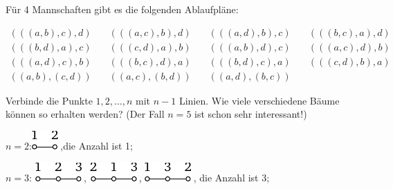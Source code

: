 \documentclass[12pt]{article} %
\begin{document}
Für 4 Mannschaften gibt es die folgenden Ablaufpläne:

$$\begin{array}{cccc}
(((a,b),c),d) & \quad (((a,c),b),d) & \quad (((a,d),b),c) & \quad (((b,c),a),d) \\
(((b,d),a),c) & \quad (((c,d),a),b) & \quad (((a,b),d),c) & \quad (((a,c),d),b) \\ 
(((a,d),c),b) & \quad (((b,c),d),a) & \quad (((b,d),c),a) & \quad (((c,d),b),a) \\
((a,b),(c,d)) & \quad ((a,c),(b,d)) & \quad ((a,d),(b,c))

\end{array}$$

\bigskip
{} Verbinde die Punkte $1, 2, \dots, n$ mit $n-1$ Linien. Wie viele verschiedene Bäume können so erhalten werden? (Der Fall $n=5$ ist schon sehr interessant!)

\medskip
$n=2$:\quad \includegraphics{taskbook-291}\,,\quad die Anzahl ist 1; 

\medskip
$n=3$:\quad 
\includegraphics{taskbook-292}\,,\quad 
\includegraphics{taskbook-293}\,,\quad 
\includegraphics{taskbook-294}\,,\quad 
die Anzahl ist 3;
\end{document}
